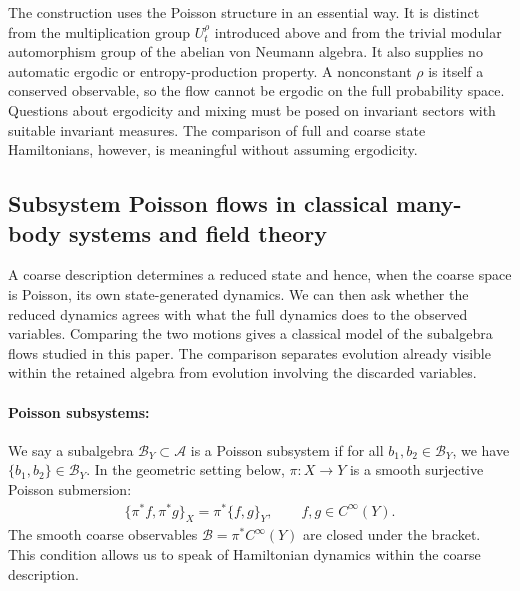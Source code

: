 \documentclass[a4paper,11pt]{article}
\theoremstyle{definition}
\newcommand{\mA}{\mathcal{A}}
\newcommand{\mB}{\mathcal{B}}
\begin{document}
The construction uses the Poisson structure in an essential way. It is distinct from the multiplication group $U_t^\rho$ introduced above and from the trivial modular automorphism group of the abelian von Neumann algebra. It also supplies no automatic ergodic or entropy-production property. A nonconstant $\rho$ is itself a conserved observable, so the flow cannot be ergodic on the full probability space. Questions about ergodicity and mixing must be posed on invariant sectors with suitable invariant measures. The comparison of full and coarse state Hamiltonians, however, is meaningful without assuming ergodicity.

\subsection{Subsystem Poisson flows in classical many-body systems and field theory}
\label{subsec:classical-subalgebra-Hamiltonian}

A coarse description determines a reduced state and hence, when the coarse space is Poisson, its own state-generated dynamics. We can then ask whether the reduced dynamics agrees with what the full dynamics does to the observed variables. Comparing the two motions gives a classical model of the subalgebra flows studied in this paper. The comparison separates evolution already visible within the retained algebra from evolution involving the discarded variables.

\paragraph{Poisson subsystems:} We say a subalgebra $\mB_Y\subset \mA$ is a Poisson subsystem if for all $b_1,b_2\in \mB_Y$, we have $\{b_1,b_2\}\in \mB_Y$. In the geometric setting below, $\pi:X\to Y$ is a smooth surjective Poisson submersion:
\begin{align}\label{eq:classical-Poisson-subsystem}
    \{\pi^*f,\pi^*g\}_X=\pi^*\{f,g\}_Y,
    \qquad f,g\in C^\infty(Y).
\end{align}
The smooth coarse observables $\mathcal B=\pi^*C^\infty(Y)$ are closed under the bracket. This condition allows us to speak of Hamiltonian dynamics within the coarse description.
\end{document}
